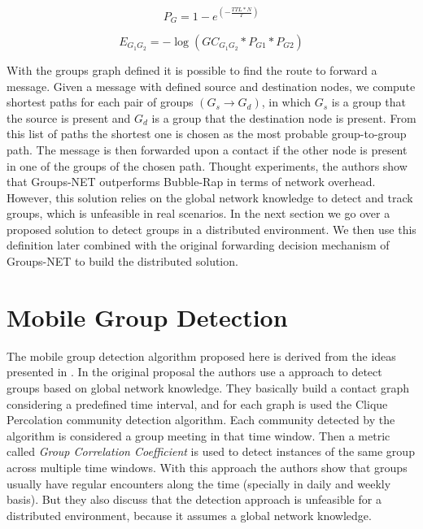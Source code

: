 \begin{equation}
	\label{eq:encounterProbability}
    P_G = 1 - e^{(-\frac{TTL * N}{T})}
\end{equation}

\begin{equation}
	\label{eq:edgeWeight}
    E_{G_1G_2} = -\log(GC_{G_1G_2} * P_{G1} * P_{G2})
\end{equation}

With the groups graph defined it is possible to find the route to forward a message. Given a message with defined source and destination nodes, we compute shortest paths for each pair of groups $(G_s \rightarrow G_d)$, in which $G_s$ is a group that the source is present and $G_d$ is a group that the destination node is present. From this list of paths the shortest one is chosen as the most probable group-to-group path. The message is then forwarded upon a contact if the other node is present in one of the groups of the chosen path. Thought experiments, the authors show that Groups-NET outperforms Bubble-Rap in terms of network overhead. However, this solution relies on the global network knowledge to detect and track groups, which is unfeasible in real scenarios. In the next section we go over a proposed solution to detect groups in a distributed environment. We then use this definition later combined with the original forwarding decision mechanism of Groups-NET to build the distributed solution.


\section{Mobile Group Detection}
\label{sec:distributedGroupsNET}

The mobile group detection algorithm proposed here is derived from the ideas presented in \citep{groupMobility}. In the original proposal the authors use a approach to detect groups based on global network knowledge. They basically build a contact graph considering a predefined time interval, and for each graph is used the Clique Percolation community detection algorithm. Each community detected by the algorithm is considered a group meeting in that time window. Then
a metric called \textit{Group Correlation Coefficient} is used to detect instances of the same group across multiple time windows. With this approach the authors show that groups usually have regular encounters along the time (specially in daily and weekly basis). But they also discuss that the detection approach is unfeasible for a distributed environment, because it assumes a global network knowledge.

